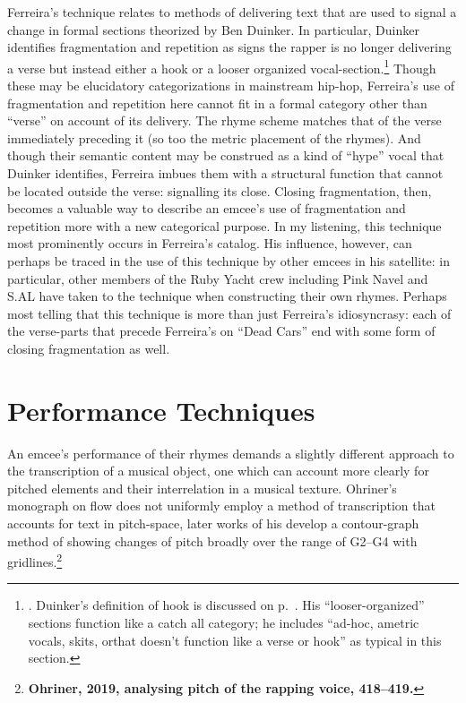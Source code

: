 Ferreira's technique relates to methods of delivering text that are used to signal a change in formal sections
theorized by Ben Duinker. In particular, Duinker identifies fragmentation and repetition as signs the rapper
is no longer delivering a verse but instead either a hook or a looser organized vocal-section.\footnote{
    \autocite[98--101]{benduinkerSongFormMainstreaming2020}. Duinker's definition of hook is discussed on
    p.~\pageref{duinkerhookdef}. His ``looser-organized'' sections function like a catch all category; he
    includes ``ad-hoc, ametric vocals, skits, or\textellipsis [rapping] that doesn't function like a verse
    or hook'' as typical in this section.}
Though these may be elucidatory categorizations in mainstream hip-hop, Ferreira's use of fragmentation and
repetition here cannot fit in a formal category other than ``verse'' on account of its delivery. The rhyme 
scheme matches that of the verse immediately preceding it (so too the metric placement of the rhymes). And
though their semantic content may be construed as a kind of ``hype'' vocal that Duinker identifies, Ferreira
imbues them with a structural function that cannot be located outside the verse: signalling its close. Closing
fragmentation, then, becomes a valuable way to describe an emcee's use of fragmentation and repetition more
with a new categorical purpose. In my listening, this technique most prominently occurs in Ferreira's catalog. 
His influence, however, can perhaps be traced in the use of this technique by other emcees in his satellite: 
in particular, other members of the Ruby Yacht crew including Pink Navel and S.AL have taken to the technique 
when constructing their own rhymes. Perhaps most telling that this technique is more than just Ferreira's 
idiosyncrasy: each of the verse-parts that precede Ferreira's on ``Dead Cars'' end with some form of closing
fragmentation as well.

\clearpage
\section{Performance Techniques}

An emcee's performance of their rhymes demands a slightly different approach to the transcription of a musical
object, one which can account more clearly for pitched elements and their interrelation in a musical texture.
Ohriner's monograph on flow does not uniformly employ a method of transcription that accounts for text in
pitch-space, later works of his develop a contour-graph method of showing changes of pitch broadly over the
range of G2--G4 with gridlines.\footnote{
    \textbf{Ohriner, 2019, analysing pitch of the rapping voice, 418--419.}}

